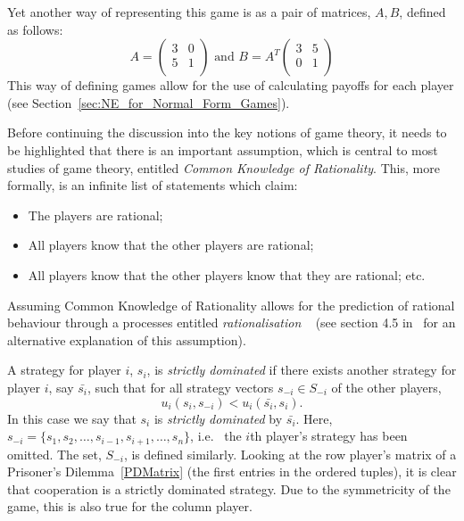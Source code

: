 Yet another way of representing this game is as a pair of matrices, \(A, B\),
defined as follows:
\[
    A = 
    \begin{pmatrix}
       3 & 0\\
       5 & 1\\ 
    \end{pmatrix}
    \text{ and } B = A^{T}
    \begin{pmatrix}
        3 & 5\\
        0 & 1\\
    \end{pmatrix}
\]
This way of defining games allow for the use of calculating payoffs for each
player (see Section~\ref{sec:NE_for_Normal_Form_Games}).

Before continuing the discussion into the key notions of game theory, it needs
to be highlighted that there is an important assumption, which is central to
most studies of game theory, entitled \textit{Common Knowledge of Rationality}.
This, more formally, is an infinite list of statements which claim:
    \begin{itemize}
        \item The players are rational;
        \item All players know that the other players are rational;
        \item All players know that the other players know that they are 
        rational; etc.    
    \end{itemize}
Assuming Common Knowledge of Rationality allows for the prediction of rational
behaviour through a processes entitled \textit{rationalisation}
~\cite{Knight2019}
(see section 4.5 in~\cite{maschler_solan_zamir_2013} for an alternative
explanation of this assumption). 


A strategy for player \(i\), \(s_{i}\), is \textit{strictly dominated} if there
exists another strategy for player \(i\), say \(\bar{s_{i}}\), such that for all
strategy vectors \(s_{-i} \in S_{-i}\) of the other players, 
\[
    u_{i}(s_{i}, s_{-i}) < u_{i}(\bar{s_{i}}, s_{i}).
\]
In this case we say that \(s_{i}\) is \textit{strictly dominated} by
\(\bar{s_{i}}\). Here, \(s_{-i} = \{s_{1}, s_{2}, \ldots, s_{i-1}, s_{i+1},
\ldots, s_{n}\} \), i.e. \ the \(i\)th player's strategy has been omitted. The
set, \(S_{-i}\), is defined similarly. Looking at the row player's matrix of a
Prisoner's Dilemma~\ref{PDMatrix} (the first entries in the ordered tuples), it
is clear that cooperation is a strictly dominated strategy. Due to the
symmetricity of the game, this is also true for the column
player.~\cite{maschler_solan_zamir_2013}



